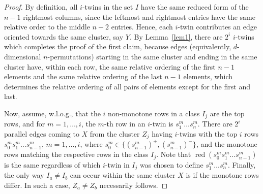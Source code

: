 \documentclass[10pt,a4paper]{amsart}
\DeclareMathOperator{\red}{red}
\begin{document}
\begin{proof} By definition, all $i$-twins in the set $I$ have the same reduced form of the $n-1$ rightmost columns, since the leftmost and rightmost entries have the same relative order to the middle $n-2$ entries. Hence, each $i$-twin contributes an edge oriented towards the same cluster, say $Y$. By Lemma~\ref{lem1}, there are $2^i$ $i$-twins which completes the proof of the first claim, because edges (equivalently, $d$-dimensional $n$-permutations) starting in the same cluster and ending in the same cluster have, within each row, the same relative ordering of the first $n-1$ elements and the same relative ordering of the last $n-1$ elements, which determines the relative ordering of all pairs of elements except for the first and last. 

Now, assume, w.l.o.g., that the $i$ non-monotone rows in a class $I_j$ are the top rows, and for $m=1,\ldots,i$, the $m$-th row in an $i$-twin is $s^m_1\ldots s^m_n$. There are $2^i$ parallel edges coming to $X$ from the cluster $Z_j$ having $i$-twins with the top $i$ rows $s^m_0s^m_1\ldots s^m_{n-1}$, $m=1,\ldots,i$,  where $s^m_0\in\{(s^m_{n-1})^+,(s^m_{n-1})^-\}$, and the monotone rows matching the respective rows in the class $I_j$. Note that $\red(s^m_0s^m_1\ldots s^m_{n-1})$ is the same regardless of which $i$-twin in $I_j$ was chosen to define $s^m_1\ldots s^m_n$. Finally, the only way $I_a\neq I_b$ can occur within  the same cluster $X$ is if the monotone rows differ. In such a case, $Z_a\neq Z_b$ necessarily follows. 
\end{proof}
\end{document}
